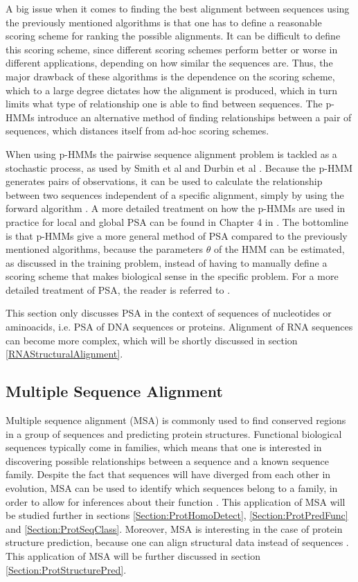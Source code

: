 \documentclass{article}\usepackage[]{graphicx}\usepackage[]{color}
\begin{document}
A big issue when it comes to finding the best alignment between sequences using the previously mentioned algorithms is that one has to define a reasonable scoring scheme for ranking the possible alignments. It can be difficult to define this scoring scheme, since different scoring schemes perform better or worse in different applications, depending on how similar the sequences are. Thus, the major drawback of these algorithms is the dependence on the scoring scheme, which to a large degree dictates how the alignment is produced, which in turn limits what type of relationship one is able to find between sequences. The p-HMMs introduce an alternative method of finding relationships between a pair of sequences, which distances itself from ad-hoc scoring schemes. 

When using p-HMMs the pairwise sequence alignment problem is tackled as a stochastic process, as used by Smith et al \cite{Smith2003} and Durbin et al \cite{Durbin1998}. Because the p-HMM generates pairs of observations, it can be used to calculate the relationship between two sequences independent of a specific alignment, simply by using the forward algorithm \cite{Choo2004}. A more detailed treatment on how the p-HMMs are used in practice for local and global PSA can be found in Chapter 4 in \cite{Durbin1998}. The bottomline is that p-HMMs give a more general method of PSA compared to the previously mentioned algorithms, because the parameters $\theta$ of the HMM can be estimated, as discussed in the training problem, instead of having to manually define a scoring scheme that makes biological sense in the specific problem. For a more detailed treatment of PSA, the reader is referred to \cite{Durbin1998}.

This section only discusses PSA in the context of sequences of nucleotides or aminoacids, i.e. PSA of DNA sequences or proteins. Alignment of RNA sequences can become more complex, which will be shortly discussed in section \ref{RNAStructuralAlignment}.

\subsection{Multiple Sequence Alignment}\label{Section:MSA}
Multiple sequence alignment (MSA) is commonly used to find conserved regions in a group of sequences and predicting protein structures. Functional biological sequences typically come in families, which means that one is interested in discovering possible relationships between a sequence and a known sequence family. Despite the fact that sequences will have diverged from each other in evolution, MSA can be used to identify which sequences belong to a family, in order to allow for inferences about their function \cite{Durbin1998}. This application of MSA will be studied further in sections \ref{Section:ProtHomoDetect}, \ref{Section:ProtPredFunc} and \ref{Section:ProtSeqClass}. Moreover, MSA is interesting in the case of protein structure prediction, because one can align structural data instead of sequences \cite{Eddy1998}. This application of MSA will be further discussed in section \ref{Section:ProtStructurePred}. 
\end{document}
